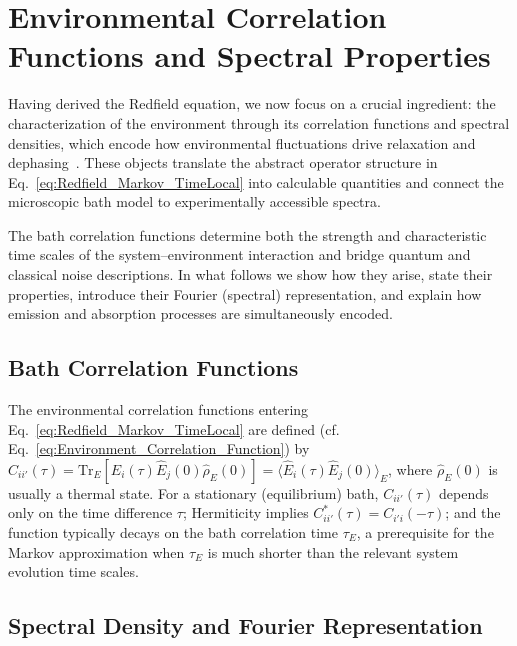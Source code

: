 \section{Environmental Correlation Functions and Spectral Properties}
\label{sec:environmental_correlation_functions}

\noindent
Having derived the Redfield equation, we now focus on a crucial ingredient: the characterization of the environment through its correlation functions and spectral densities, which encode how environmental fluctuations drive relaxation and dephasing~\cite{breuerpetruccione2009theoryopenquantum, weiss2012quantumdissipativesystems}. These objects translate the abstract operator structure in Eq.~\eqref{eq:Redfield_Markov_TimeLocal} into calculable quantities and connect the microscopic bath model to experimentally accessible spectra.

\noindent
The bath correlation functions determine both the strength and characteristic time scales of the system--environment interaction and bridge quantum and classical noise descriptions. In what follows we show how they arise, state their properties, introduce their Fourier (spectral) representation, and explain how emission and absorption processes are simultaneously encoded.


\subsection{Bath Correlation Functions}
\label{subsec:bath_correlation_functions}

\noindent
The environmental correlation functions entering Eq.~\eqref{eq:Redfield_Markov_TimeLocal} are defined (cf. Eq.~\eqref{eq:Environment_Correlation_Function}) by $C_{ii'}(\tau) = \mathrm{Tr}_E[\hat{E}_i(\tau) \hat{E}_j(0) \hat{\rho}_E(0)] = \langle \hat{E}_i(\tau) \hat{E}_j(0) \rangle_E$, where $\hat{\rho}_E(0)$ is usually a thermal state. For a stationary (equilibrium) bath, $C_{ii'}(\tau)$ depends only on the time difference $\tau$; Hermiticity implies $C_{ii'}^*(\tau)=C_{i'i}(-\tau)$; and the function typically decays on the bath correlation time $\tau_E$, a prerequisite for the Markov approximation when $\tau_E$ is much shorter than the relevant system evolution time scales.


\subsection{Spectral Density and Fourier Representation}
\label{subsec:spectral_density_representation}


